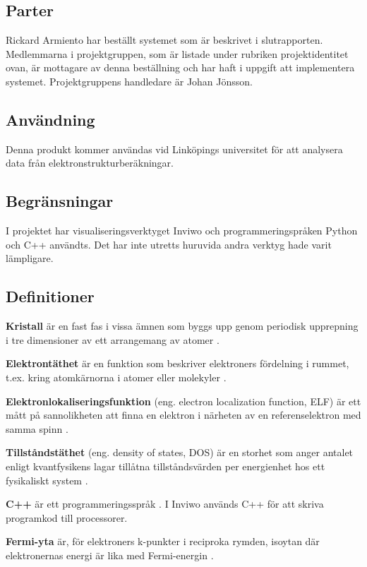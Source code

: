 \documentclass[a4paper,12pt,twoside,openright]{report}
\begin{document}
\subsection{Parter}
Rickard Armiento har beställt systemet som är beskrivet i slutrapporten. Medlemmarna i projektgruppen, som är listade under rubriken projektidentitet ovan, är mottagare av denna beställning och har haft i uppgift att implementera systemet. Projektgruppens handledare är Johan Jönsson.


\subsection{Användning}
Denna produkt kommer användas vid Linköpings universitet för att analysera data från elektronstrukturberäkningar.

\subsection{Begränsningar}
I projektet har visualiseringsverktyget Inviwo och
programmeringspråken Python och C++ användts. Det har inte utretts huruvida andra verktyg hade varit lämpligare.


\subsection{Definitioner}
\textbf{Kristall} är en fast fas i vissa ämnen som byggs upp genom periodisk upprepning i tre dimensioner av ett arrangemang av atomer \cite{kristall}.

\textbf{Elektrontäthet} är en funktion som beskriver elektroners fördelning i rummet, t.ex. kring atomkärnorna i atomer eller molekyler \cite{elektrontathet}.

\textbf{Elektronlokaliseringsfunktion} (eng. electron localization function, ELF) är ett mått på sannolikheten att finna en elektron i närheten av en referenselektron med samma spinn \cite{ELF}.

\textbf{Tillståndstäthet} (eng. density of states, DOS) är en storhet som anger antalet enligt kvantfysikens lagar tillåtna tillståndsvärden per energienhet hos ett fysikaliskt system \cite{DOS}.

\textbf{C++} är ett programmeringsspråk
\cite{C++}.
\newline
I Inviwo används C++ för att skriva programkod till
processorer.

\textbf{Fermi-yta} är, för elektroners k-punkter i reciproka rymden, isoytan där elektronernas energi är lika med Fermi-energin
\cite{Fermi-yta}.
\end{document}
